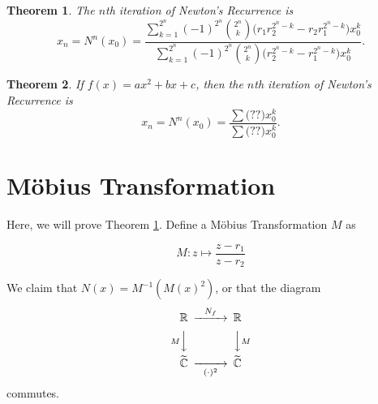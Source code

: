 \documentclass[notitlepage, 10pt]{article}
\newtheorem{theorem}{Theorem}
\newcommand{\R}{\mathbb{R}}
\newcommand{\Cstar}{\widetilde{\mathbb{C}}}
\begin{document}
\begin{theorem}\label{rform}
The $n$th iteration of Newton's Recurrence is 
$$
x_n = N^n(x_0) = \frac
{ \sum\limits_{k=1}^{2^n}(-1)^{2^n} {2^n \choose k} 
\Big( r_1 r_2^{2^n-k} - r_2r_1^{2^n-k} \Big) x_0^k }
{\sum\limits_{k=1}^{2^n}(-1)^{2^n} {2^n \choose k}
\Big( r_2^{2^n-k} - r_1^{2^n-k} \Big) x_0^k}.
$$
\end{theorem}

\begin{theorem}\label{abcform}
If $f(x)= ax^2+bx+c$, then the $n$th iteration of Newton's Recurrence
is
$$
x_n = N^n(x_0) = \frac
{ \sum
\Big( ?? \Big) x_0^k }
{\sum
\Big( ?? \Big) x_0^k}.
$$
\end{theorem}


\section{M\"obius Transformation}

Here, we will prove Theorem \ref{rform}.
Define a M\"obius Transformation $M$ as

$$M : z \mapsto \frac{z-r_1}{z-r_2}$$

We claim that $N(x) = M^{-1}(M(x)^2)$, or that the diagram
\[ 
\begin{CD}\label{...} 
\R @> N_f >> \R \\ 
@ V{M} VV @ VV {M} V \\ 
\Cstar @>> (\cdot)^2 > \Cstar \\ 
\end{CD} 
\] 
commutes.





\end{document}
